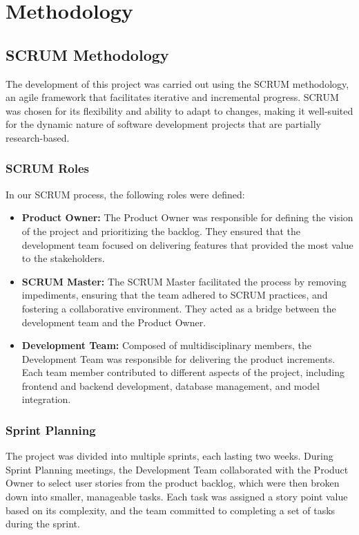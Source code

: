 \documentclass[a4paper,12pt,twoside]{ThesisStyle}
\begin{document}
\chapter{Methodology}
\label{cap:methodology}

\section{SCRUM Methodology}

The development of this project was carried out using the SCRUM methodology, an agile framework that facilitates iterative and incremental progress. SCRUM was chosen for its flexibility and ability to adapt to changes, making it well-suited for the dynamic nature of software development projects that are partially research-based.

\subsection{SCRUM Roles}

In our SCRUM process, the following roles were defined:
\begin{itemize}
    \item \textbf{Product Owner:} The Product Owner was responsible for defining the vision of the project and prioritizing the backlog. They ensured that the development team focused on delivering features that provided the most value to the stakeholders.
    \item \textbf{SCRUM Master:} The SCRUM Master facilitated the process by removing impediments, ensuring that the team adhered to SCRUM practices, and fostering a collaborative environment. They acted as a bridge between the development team and the Product Owner.
    \item \textbf{Development Team:} Composed of multidisciplinary members, the Development Team was responsible for delivering the product increments. Each team member contributed to different aspects of the project, including frontend and backend development, database management, and model integration.
\end{itemize}

\subsection{Sprint Planning}

The project was divided into multiple sprints, each lasting two weeks. During Sprint Planning meetings, the Development Team collaborated with the Product Owner to select user stories from the product backlog, which were then broken down into smaller, manageable tasks. Each task was assigned a story point value based on its complexity, and the team committed to completing a set of tasks during the sprint.
\end{document}
